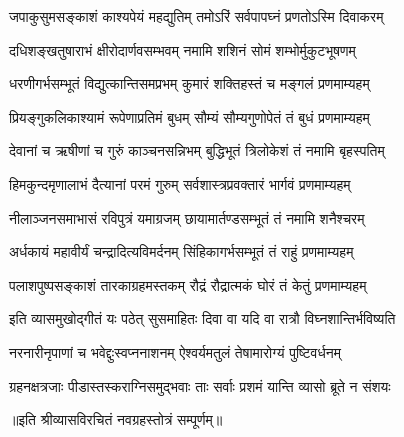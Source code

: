 

\twolineshloka
{जपाकुसुमसङ्काशं काश्यपेयं महद्युतिम्}
{तमोऽरिं सर्वपापघ्नं प्रणतोऽस्मि दिवाकरम्}

\twolineshloka
{दधिशङ्खतुषाराभं क्षीरोदार्णवसम्भवम्}
{नमामि शशिनं सोमं शम्भोर्मुकुटभूषणम्}

\twolineshloka
{धरणीगर्भसम्भूतं विद्युत्कान्तिसमप्रभम्}
{कुमारं शक्तिहस्तं च मङ्गलं प्रणमाम्यहम्}

\twolineshloka
{प्रियङ्गुकलिकाश्यामं रूपेणाप्रतिमं बुधम्}
{सौम्यं सौम्यगुणोपेतं तं बुधं प्रणमाम्यहम्}

\twolineshloka
{देवानां च ऋषीणां च गुरुं काञ्चनसन्निभम्}
{बुद्धिभूतं त्रिलोकेशं तं नमामि बृहस्पतिम्}

\twolineshloka
{हिमकुन्दमृणालाभं दैत्यानां परमं गुरुम्}
{सर्वशास्त्रप्रवक्तारं भार्गवं प्रणमाम्यहम्}

\twolineshloka
{नीलाञ्जनसमाभासं रविपुत्रं यमाग्रजम्}
{छायामार्तण्डसम्भूतं तं नमामि शनैश्चरम्}

\twolineshloka
{अर्धकायं महावीर्यं चन्द्रादित्यविमर्दनम्}
{सिंहिकागर्भसम्भूतं तं राहुं प्रणमाम्यहम्}

\twolineshloka
{पलाशपुष्पसङ्काशं तारकाग्रहमस्तकम्}
{रौद्रं रौद्रात्मकं घोरं तं केतुं प्रणमाम्यहम्}

\twolineshloka
{इति व्यासमुखोद्गीतं यः पठेत् सुसमाहितः}
{दिवा वा यदि वा रात्रौ विघ्नशान्तिर्भविष्यति}

\twolineshloka
{नरनारीनृपाणां च भवेद्दुःस्वप्ननाशनम्}
{ऐश्वर्यमतुलं तेषामारोग्यं पुष्टिवर्धनम्}

\twolineshloka
{ग्रहनक्षत्रजाः पीडास्तस्कराग्निसमुद्भवाः}
{ताः सर्वाः प्रशमं यान्ति व्यासो ब्रूते न संशयः}

॥इति श्रीव्यासविरचितं नवग्रहस्तोत्रं सम्पूर्णम्॥

